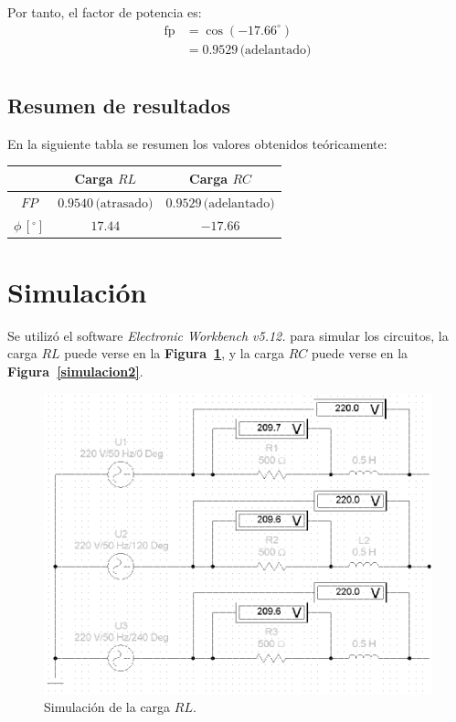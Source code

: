 \documentclass[letter,11pt]{article}
\begin{document}
Por tanto, el factor de potencia es:
\begin{equation*}
    \begin{split}
        \text{fp} &= \cos(-17.66^{\circ})\\
                  &= 0.9529\,\text{(adelantado)}\\
    \end{split}
\end{equation*}

\subsection{Resumen de resultados}
En la siguiente tabla se resumen los valores obtenidos teóricamente:

\begin{center}
    \begin{tabular}{|c||c|c|}
    \hline
    & \textbf{Carga $RL$} & \textbf{Carga $RC$}
    \tabularnewline \hline \hline
    $FP$ &
    $0.9540\,\text{(atrasado)}$ &
    $0.9529\,\text{(adelantado)}$
    \tabularnewline \hline
    $\phi\,[^{\circ}]$ &
    $17.44$ &
    $-17.66$
    \tabularnewline \hline
    \end{tabular}
\end{center}

\section{Simulación}
Se utilizó el software \emph{Electronic Workbench v5.12.} para simular
los circuitos, la carga $RL$ puede verse en la
\textbf{Figura~\ref{simulacion1}}, y la carga $RC$ puede verse en la
\textbf{Figura~\ref{simulacion2}}.

\begin{figure}[!h]
\centering
\includegraphics[scale=1.06]{simulacion/practica7.1.eps}
\caption{Simulación de la carga $RL$.}
\label{simulacion1}
\end{figure}
\end{document}

